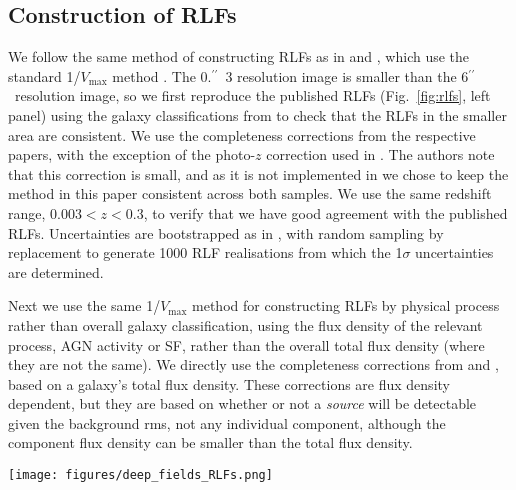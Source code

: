\documentclass[usenatbib,fleqn,letters]{mnras}
\newcommand{\sarc}{$^{\prime\prime}\!\!$}
\begin{document}
\subsection{Construction of RLFs}
We follow the same method of constructing RLFs as in \cite{kondapally_cosmic_2022} and \cite{cochrane_lofar_2023}, which use the standard 1/$V_{\mathrm{max}}$ method \citep{schmidt_space_1968,condon_14_1989}. The 0.\sarc\ 3 resolution image is smaller than the 6\sarc\ resolution image, so we first reproduce the published RLFs (Fig.~\ref{fig:rlfs}, left panel) using the galaxy classifications from  to check that the RLFs in the smaller area are consistent. We use the completeness corrections from the respective papers, with the exception of the photo-$z$ correction used in \cite{cochrane_lofar_2023}. The authors note that this correction is small, and as it is not implemented in \cite{kondapally_cosmic_2022} we chose to keep the method in this paper consistent across both samples. We use the same redshift range, $0.003 < z < 0.3$, to verify that we have good agreement with the published RLFs. Uncertainties are bootstrapped as in \cite{kondapally_cosmic_2022}, with random sampling by replacement to generate 1000 RLF realisations from which the 1$\sigma$ uncertainties are determined. 

Next we use the same 1/$V_{\mathrm{max}}$ method for constructing RLFs by physical process rather than overall galaxy classification, using the flux density of the relevant process, AGN activity or SF, rather than the overall total flux density (where they are not the same). We directly use the completeness corrections from \cite{cochrane_lofar_2023} and \cite{kondapally_cosmic_2022}, based on a galaxy's total flux density. These corrections are flux density dependent, but they are based on 
whether or not a \textit{source} will be detectable given the background rms, not any individual component, although the component flux density can be smaller than the total flux density. 

\begin{figure*}
    \centering
    \texttt{[image: figures/deep\_fields\_RLFs.png]}
    \caption{\textit{Left:} The re-calculated galaxy RLFs (dotted lines) for the smaller area considered here, compared with previously published RLFs (solid lines). \textit{Middle:} RLFs calculated by process rather than galaxy. \textit{Right top:} RLFs calculated here by galaxy classifications (dotted lines) and by physical process (solid lines; orange for AGN and green for SF). \textit{Bottom right:} $\Delta$RLF for both AGN and SF. Hatched regions show where the uncertainties are large and values should be treated with caution.}
    \label{fig:rlfs}
\end{figure*}
\end{document}
